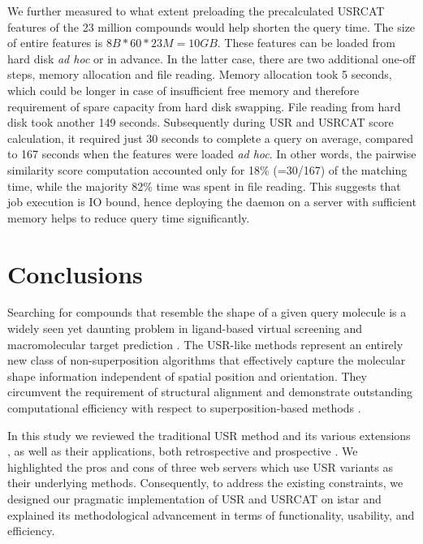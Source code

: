 We further measured to what extent preloading the precalculated USRCAT features of the 23 million compounds would help shorten the query time. The size of entire features is $8B*60*23M=10GB$. These features can be loaded from hard disk \textit{ad hoc} or in advance. In the latter case, there are two additional one-off steps, memory allocation and file reading. Memory allocation took 5 seconds, which could be longer in case of insufficient free memory and therefore requirement of spare capacity from hard disk swapping. File reading from hard disk took another 149 seconds. Subsequently during USR and USRCAT score calculation, it required just 30 seconds to complete a query on average, compared to 167 seconds when the features were loaded \textit{ad hoc}. In other words, the pairwise similarity score computation accounted only for 18\% (=30/167) of the matching time, while the majority 82\% time was spent in file reading. This suggests that job execution is IO bound, hence deploying the daemon on a server with sufficient memory helps to reduce query time significantly.

\section{Conclusions}

Searching for compounds that resemble the shape of a given query molecule is a widely seen yet daunting problem in ligand-based virtual screening \citep{1332,1380,1281,1504,1502} and macromolecular target prediction \citep{1407,1408,1402}. The USR-like methods \citep{1379,1338,1331} represent an entirely new class of non-superposition algorithms that effectively capture the molecular shape information independent of spatial position and orientation. They circumvent the requirement of structural alignment and demonstrate outstanding computational efficiency with respect to superposition-based methods \citep{1440,887,1439}.

In this study we reviewed the traditional USR method \citep{1379} and its various extensions \citep{1333,1436,1437,1334,1335,1337,1338,1331,1407,1408}, as well as their applications, both retrospective \citep{1332,1331} and prospective \citep{1505,1380,1281,1504,1502,1615}. We highlighted the pros and cons of three web servers \citep{1436,1437,1408} which use USR variants as their underlying methods. Consequently, to address the existing constraints, we designed our pragmatic implementation of USR \citep{1379} and USRCAT \citep{1331} on istar \citep{1362} and explained its methodological advancement in terms of functionality, usability, and efficiency.


